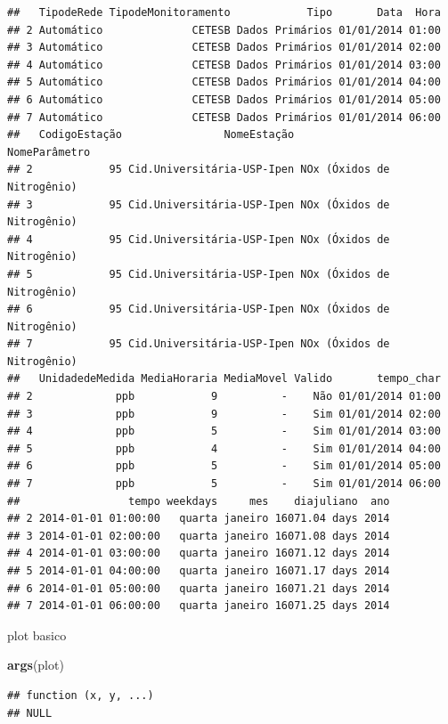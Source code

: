 \documentclass[]{book}
\newenvironment{Shaded}{\begin{snugshade}}{\end{snugshade}}
\newcommand{\KeywordTok}[1]{\textcolor[rgb]{0.13,0.29,0.53}{\textbf{#1}}}
\newcommand{\NormalTok}[1]{#1}
\begin{document}
\begin{verbatim}
##   TipodeRede TipodeMonitoramento            Tipo       Data  Hora
## 2 Automático              CETESB Dados Primários 01/01/2014 01:00
## 3 Automático              CETESB Dados Primários 01/01/2014 02:00
## 4 Automático              CETESB Dados Primários 01/01/2014 03:00
## 5 Automático              CETESB Dados Primários 01/01/2014 04:00
## 6 Automático              CETESB Dados Primários 01/01/2014 05:00
## 7 Automático              CETESB Dados Primários 01/01/2014 06:00
##   CodigoEstação                NomeEstação              NomeParâmetro
## 2            95 Cid.Universitária-USP-Ipen NOx (Óxidos de Nitrogênio)
## 3            95 Cid.Universitária-USP-Ipen NOx (Óxidos de Nitrogênio)
## 4            95 Cid.Universitária-USP-Ipen NOx (Óxidos de Nitrogênio)
## 5            95 Cid.Universitária-USP-Ipen NOx (Óxidos de Nitrogênio)
## 6            95 Cid.Universitária-USP-Ipen NOx (Óxidos de Nitrogênio)
## 7            95 Cid.Universitária-USP-Ipen NOx (Óxidos de Nitrogênio)
##   UnidadedeMedida MediaHoraria MediaMovel Valido       tempo_char
## 2             ppb            9          -    Não 01/01/2014 01:00
## 3             ppb            9          -    Sim 01/01/2014 02:00
## 4             ppb            5          -    Sim 01/01/2014 03:00
## 5             ppb            4          -    Sim 01/01/2014 04:00
## 6             ppb            5          -    Sim 01/01/2014 05:00
## 7             ppb            5          -    Sim 01/01/2014 06:00
##                 tempo weekdays     mes    diajuliano  ano
## 2 2014-01-01 01:00:00   quarta janeiro 16071.04 days 2014
## 3 2014-01-01 02:00:00   quarta janeiro 16071.08 days 2014
## 4 2014-01-01 03:00:00   quarta janeiro 16071.12 days 2014
## 5 2014-01-01 04:00:00   quarta janeiro 16071.17 days 2014
## 6 2014-01-01 05:00:00   quarta janeiro 16071.21 days 2014
## 7 2014-01-01 06:00:00   quarta janeiro 16071.25 days 2014
\end{verbatim}

plot basico

\begin{Shaded}
\begin{Highlighting}[]
\KeywordTok{args}\NormalTok{(plot)}
\end{Highlighting}
\end{Shaded}

\begin{verbatim}
## function (x, y, ...) 
## NULL
\end{verbatim}
\end{document}
